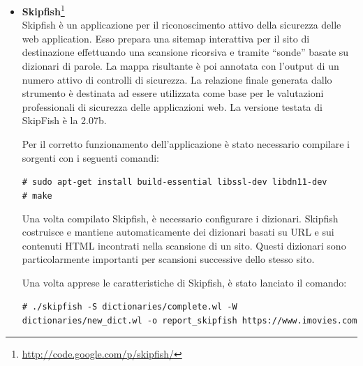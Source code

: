 \documentclass{article}
\begin{document}
\begin{itemize}
Sono state individuate in tutto 57 vulnerabilità.
Ognuna delle vulnerabilità segnala che, ad una richiesta particolare, il server ha risposto con un codice d'errore \emph{500}\footnote{Questo codice d'errore indica un errore generico avvenuto sul server a seguito di una richiesta impossibile da risolvere(Internal server error).}.

\item \textbf{Skipfish}\footnote{\url{http://code.google.com/p/skipfish/}}\\
Skipfish è un applicazione per il riconoscimento attivo della sicurezza delle web application. Esso prepara una sitemap interattiva per il sito di destinazione effettuando una scansione ricorsiva e tramite ``sonde'' basate su dizionari di parole. La mappa risultante è poi annotata con l'output di un numero attivo di controlli di sicurezza. La relazione finale generata dallo strumento è destinata ad essere utilizzata come base per le valutazioni professionali di sicurezza delle applicazioni web. La versione testata di SkipFish è la 2.07b.

Per il corretto funzionamento dell'applicazione è stato necessario compilare i sorgenti con i seguenti comandi:

\small
{\tt  \# sudo apt-get install build-essential libssl-dev libdn11-dev\\
\# make\\
}

Una volta compilato Skipfish, è necessario configurare i dizionari.
Skipfish costruisce e mantiene automaticamente dei dizionari basati su URL e sui contenuti HTML incontrati nella scansione di un sito.
Questi dizionari sono particolarmente importanti per scansioni successive dello stesso sito.

Una volta apprese le caratteristiche di Skipfish, è stato lanciato il comando:

\small
{\tt \# ./skipfish -S dictionaries/complete.wl -W dictionaries/new\_dict.wl -o report\_skipfish https://www.imovies.com
}


\end{itemize}
\end{document}

